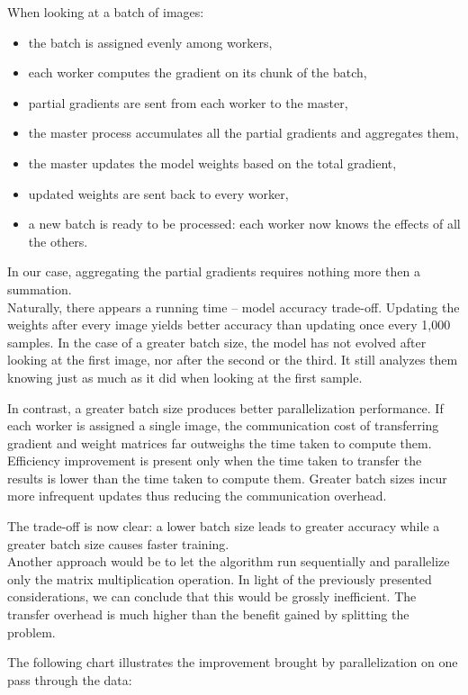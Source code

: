 \documentclass[a4paper]{article}
\begin{document}
When looking at a batch of images:
\begin{itemize}
\item the batch is assigned evenly among workers,
\item each worker computes the gradient on its chunk of the batch,
\item partial gradients are sent from each worker to the master,
\item the master process accumulates all the partial gradients and aggregates them,
\item the master updates the model weights based on the total gradient,
\item updated weights are sent back to every worker,
\item a new batch is ready to be processed: each worker now knows the effects of all the others.
\end{itemize}
In our case, aggregating the partial gradients requires nothing more then a summation.
\\

Naturally, there appears a running time -- model accuracy trade-off. Updating the weights after every image yields better accuracy than updating once every 1,000 samples. In the case of a greater batch size, the model has not evolved after looking at the first image, nor after the second or the third. It still analyzes them knowing just as much as it did when looking at the first sample.

In contrast, a greater batch size produces better parallelization performance. If each worker is assigned a single image, the communication cost of transferring gradient and weight matrices far outweighs the time taken to compute them. Efficiency improvement is present only when the time taken to transfer the results is lower than the time taken to compute them. Greater batch sizes incur more infrequent updates thus reducing the communication overhead.

The trade-off is now clear: a lower batch size leads to greater accuracy while a greater batch size causes faster training.
\\

Another approach would be to let the algorithm run sequentially and parallelize only the matrix multiplication operation. In light of the previously presented considerations, we can conclude that this would be grossly inefficient. The transfer overhead is much higher than the benefit gained by splitting the problem.

The following chart illustrates the improvement brought by parallelization on one pass through the data:
\end{document}
